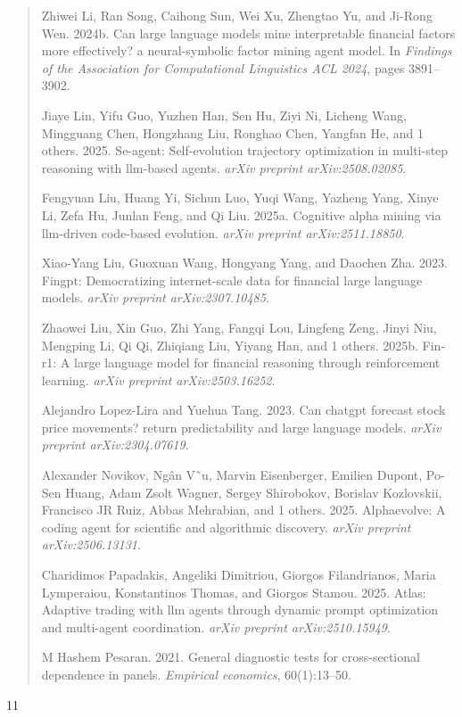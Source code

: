 \documentclass[
]{article}
\begin{document}
\begin{quote}
Zhiwei Li, Ran Song, Caihong Sun, Wei Xu, Zhengtao Yu, and Ji-Rong Wen.
2024b. Can large language models mine interpretable financial factors
more effectively? a neural-symbolic factor mining agent model. In
\emph{Findings of the Association for Computational Linguistics ACL
2024}, pages 3891--3902.

Jiaye Lin, Yifu Guo, Yuzhen Han, Sen Hu, Ziyi Ni, Licheng Wang,
Mingguang Chen, Hongzhang Liu, Ronghao Chen, Yangfan He, and 1 others.
2025. Se-agent: Self-evolution trajectory optimization in multi-step
reasoning with llm-based agents. \emph{arXiv preprint arXiv:2508.02085}.

Fengyuan Liu, Huang Yi, Sichun Luo, Yuqi Wang, Yazheng Yang, Xinye Li,
Zefa Hu, Junlan Feng, and Qi Liu. 2025a. Cognitive alpha mining via
llm-driven code-based evolution. \emph{arXiv preprint arXiv:2511.18850}.

Xiao-Yang Liu, Guoxuan Wang, Hongyang Yang, and Daochen Zha. 2023.
Fingpt: Democratizing internet-scale data for financial large language
models. \emph{arXiv preprint arXiv:2307.10485}.

Zhaowei Liu, Xin Guo, Zhi Yang, Fangqi Lou, Lingfeng Zeng, Jinyi Niu,
Mengping Li, Qi Qi, Zhiqiang Liu, Yiyang Han, and 1 others. 2025b.
Fin-r1: A large language model for financial reasoning through
reinforcement learning. \emph{arXiv preprint arXiv:2503.16252}.

Alejandro Lopez-Lira and Yuehua Tang. 2023. Can chatgpt forecast stock
price movements? return predictability and large language models.
\emph{arXiv preprint arXiv:2304.07619}.

Alexander Novikov, Ngân V˜u, Marvin Eisenberger, Emilien Dupont, Po-Sen
Huang, Adam Zsolt Wagner, Sergey Shirobokov, Borislav Kozlovskii,
Francisco JR Ruiz, Abbas Mehrabian, and 1 others. 2025. Alphaevolve: A
coding agent for scientific and algorithmic discovery. \emph{arXiv
preprint arXiv:2506.13131}.

Charidimos Papadakis, Angeliki Dimitriou, Giorgos Filandrianos, Maria
Lymperaiou, Konstantinos Thomas, and Giorgos Stamou. 2025. Atlas:
Adaptive trading with llm agents through dynamic prompt optimization and
multi-agent coordination. \emph{arXiv preprint arXiv:2510.15949}.

M Hashem Pesaran. 2021. General diagnostic tests for cross-sectional
dependence in panels. \emph{Empirical economics}, 60(1):13--50.
\end{quote}

11
\end{document}
